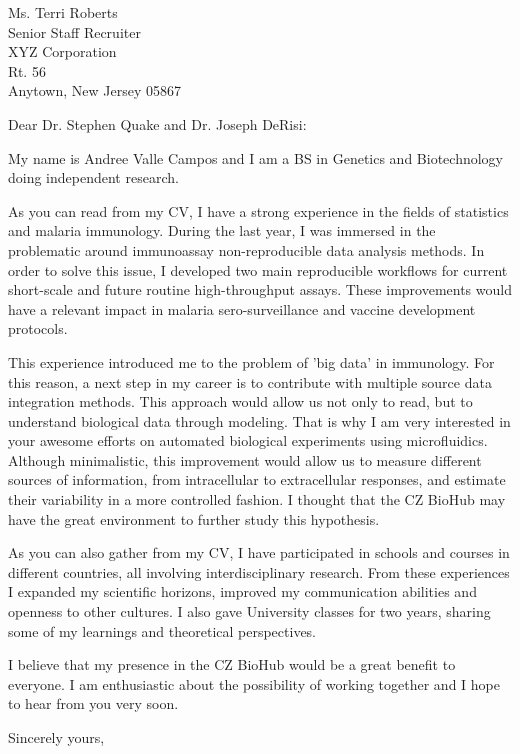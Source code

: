 \documentclass{letter} 					%
\begin{document}
\begin{letter}{
		Ms. Terri Roberts \\
		Senior Staff Recruiter \\
		XYZ Corporation \\
		Rt. 56 \\
		Anytown, New Jersey 05867
		}
%

 
\opening{Dear Dr. Stephen Quake and Dr. Joseph DeRisi:} 
 
\noindent 
My name is Andree Valle Campos and I am a BS in Genetics and Biotechnology doing independent research.

\noindent 
As you can read from my CV, I have a strong experience in the fields of statistics and malaria immunology. 
During the last year, I was immersed in the problematic around immunoassay non-reproducible data analysis methods. 
In order to solve this issue, I developed two main reproducible workflows for current short-scale and future routine high-throughput assays. 
These improvements would have a relevant impact in malaria sero-surveillance and vaccine development protocols.

\noindent 
This experience introduced me to the problem of 'big data' in immunology. 
For this reason, a next step in my career is to contribute with multiple source data integration methods. 
This approach would allow us not only to read, but to understand biological data through modeling. 
That is why I am very interested in your awesome efforts on automated biological experiments using microfluidics. 
Although minimalistic, this improvement would allow us to measure different sources of information, 
from intracellular to extracellular responses, and estimate their variability in a more controlled fashion. 
I thought that the CZ BioHub may have the great environment to further study this hypothesis.

\noindent 
As you can also gather from my CV, 
I have participated in schools and courses in different countries, all involving interdisciplinary research. 
From these experiences I expanded my scientific horizons, improved my communication abilities and openness to other cultures. 
I also gave University classes for two years, sharing some of my learnings and theoretical perspectives.

\noindent 
I believe that my presence in the CZ BioHub would be a great benefit to everyone. 
I am enthusiastic about the possibility of working together and I hope to hear from you very soon.
 
\closing{Sincerely yours,} 
  
\encl{}  				%


\end{letter}
\end{document}
